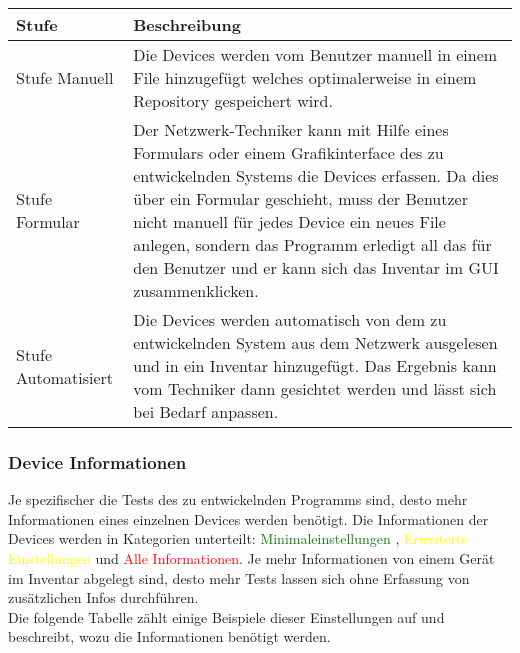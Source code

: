 \documentclass[
	ngerman,
	toc=listof, %
	toc=bibliography, %
	footnotes=multiple, %
	parskip=half, %
	numbers=noendperiod %
]{scrartcl}
\begin{document}
			\begin{tabularx}{\textwidth}{lX}
				\toprule
				Stufe & Beschreibung\\
				\midrule
				Stufe Manuell & Die Devices werden vom Benutzer manuell in einem File hinzugefügt welches optimalerweise in einem Repository gespeichert wird. \\
				\midrule
				Stufe Formular & Der Netzwerk-Techniker kann mit Hilfe eines Formulars oder einem Grafikinterface des zu entwickelnden Systems die Devices erfassen. Da dies über ein Formular geschieht, muss der Benutzer nicht manuell für jedes Device ein neues File anlegen, sondern das Programm erledigt all das für den Benutzer und er kann sich das Inventar im GUI zusammenklicken.\\
				\midrule
				Stufe Automatisiert & Die Devices werden automatisch von dem zu entwickelnden System aus dem Netzwerk ausgelesen und in ein Inventar hinzugefügt. Das Ergebnis kann vom Techniker dann gesichtet werden und lässt sich bei Bedarf anpassen. \\
				\bottomrule
			\end{tabularx}
			\newpage

		\subsubsection{Device Informationen}
			Je spezifischer die Tests des zu entwickelnden Programms sind, desto mehr Informationen eines einzelnen Devices werden benötigt.
			Die Informationen der Devices werden in Kategorien unterteilt: \textcolor{green}{Minimaleinstellungen} , \textcolor{yellow}{Erweiterte Einstellungen} und \textcolor{red}{Alle Informationen}.
			Je mehr Informationen von einem Gerät im Inventar abgelegt sind, desto mehr Tests lassen sich ohne Erfassung von zusätzlichen Infos durchführen. \\
			Die folgende Tabelle zählt einige Beispiele dieser Einstellungen auf und beschreibt, wozu die Informationen benötigt werden.
\end{document}
